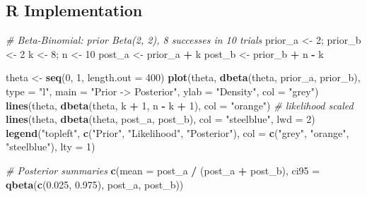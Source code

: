 \documentclass[
]{article}
\newenvironment{Shaded}{\begin{snugshade}}{\end{snugshade}}
\newcommand{\AttributeTok}[1]{\textcolor[rgb]{0.13,0.29,0.53}{#1}}
\newcommand{\CommentTok}[1]{\textcolor[rgb]{0.56,0.35,0.01}{\textit{#1}}}
\newcommand{\DecValTok}[1]{\textcolor[rgb]{0.00,0.00,0.81}{#1}}
\newcommand{\FloatTok}[1]{\textcolor[rgb]{0.00,0.00,0.81}{#1}}
\newcommand{\FunctionTok}[1]{\textcolor[rgb]{0.13,0.29,0.53}{\textbf{#1}}}
\newcommand{\NormalTok}[1]{#1}
\newcommand{\OtherTok}[1]{\textcolor[rgb]{0.56,0.35,0.01}{#1}}
\newcommand{\SpecialCharTok}[1]{\textcolor[rgb]{0.81,0.36,0.00}{\textbf{#1}}}
\newcommand{\StringTok}[1]{\textcolor[rgb]{0.31,0.60,0.02}{#1}}
\begin{document}
\subsection{R Implementation}\label{r-implementation}

\begin{Shaded}
\begin{Highlighting}[]
\CommentTok{\# Beta{-}Binomial: prior Beta(2, 2), 8 successes in 10 trials}
\NormalTok{prior\_a }\OtherTok{\textless{}{-}} \DecValTok{2}\NormalTok{; prior\_b }\OtherTok{\textless{}{-}} \DecValTok{2}
\NormalTok{k }\OtherTok{\textless{}{-}} \DecValTok{8}\NormalTok{; n }\OtherTok{\textless{}{-}} \DecValTok{10}
\NormalTok{post\_a }\OtherTok{\textless{}{-}}\NormalTok{ prior\_a }\SpecialCharTok{+}\NormalTok{ k}
\NormalTok{post\_b }\OtherTok{\textless{}{-}}\NormalTok{ prior\_b }\SpecialCharTok{+}\NormalTok{ n }\SpecialCharTok{{-}}\NormalTok{ k}

\NormalTok{theta }\OtherTok{\textless{}{-}} \FunctionTok{seq}\NormalTok{(}\DecValTok{0}\NormalTok{, }\DecValTok{1}\NormalTok{, }\AttributeTok{length.out =} \DecValTok{400}\NormalTok{)}
\FunctionTok{plot}\NormalTok{(theta, }\FunctionTok{dbeta}\NormalTok{(theta, prior\_a, prior\_b), }\AttributeTok{type =} \StringTok{"l"}\NormalTok{,}
     \AttributeTok{main =} \StringTok{"Prior {-}\textgreater{} Posterior"}\NormalTok{, }\AttributeTok{ylab =} \StringTok{"Density"}\NormalTok{, }\AttributeTok{col =} \StringTok{"grey"}\NormalTok{)}
\FunctionTok{lines}\NormalTok{(theta, }\FunctionTok{dbeta}\NormalTok{(theta, k }\SpecialCharTok{+} \DecValTok{1}\NormalTok{, n }\SpecialCharTok{{-}}\NormalTok{ k }\SpecialCharTok{+} \DecValTok{1}\NormalTok{), }\AttributeTok{col =} \StringTok{"orange"}\NormalTok{)  }\CommentTok{\# likelihood scaled}
\FunctionTok{lines}\NormalTok{(theta, }\FunctionTok{dbeta}\NormalTok{(theta, post\_a, post\_b), }\AttributeTok{col =} \StringTok{"steelblue"}\NormalTok{, }\AttributeTok{lwd =} \DecValTok{2}\NormalTok{)}
\FunctionTok{legend}\NormalTok{(}\StringTok{"topleft"}\NormalTok{, }\FunctionTok{c}\NormalTok{(}\StringTok{"Prior"}\NormalTok{, }\StringTok{"Likelihood"}\NormalTok{, }\StringTok{"Posterior"}\NormalTok{),}
       \AttributeTok{col =} \FunctionTok{c}\NormalTok{(}\StringTok{"grey"}\NormalTok{, }\StringTok{"orange"}\NormalTok{, }\StringTok{"steelblue"}\NormalTok{), }\AttributeTok{lty =} \DecValTok{1}\NormalTok{)}

\CommentTok{\# Posterior summaries}
\FunctionTok{c}\NormalTok{(}\AttributeTok{mean =}\NormalTok{ post\_a }\SpecialCharTok{/}\NormalTok{ (post\_a }\SpecialCharTok{+}\NormalTok{ post\_b),}
  \AttributeTok{ci95 =} \FunctionTok{qbeta}\NormalTok{(}\FunctionTok{c}\NormalTok{(}\FloatTok{0.025}\NormalTok{, }\FloatTok{0.975}\NormalTok{), post\_a, post\_b))}
\end{Highlighting}
\end{Shaded}
\end{document}
